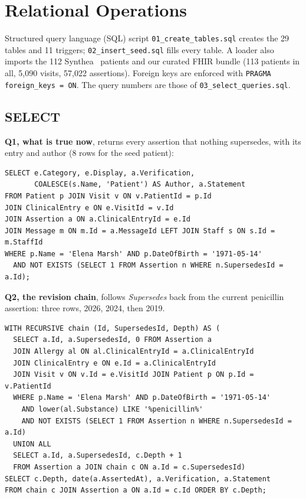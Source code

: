 \documentclass[sigconf]{acmart}
\begin{document}
\section{Relational Operations}\label{sec:operations}
Structured query language (SQL) script \texttt{01\_create\_\allowbreak tables.sql} creates the 29 tables and 11 triggers; \texttt{02\_insert\_seed.sql} fills every table. A loader also imports the 112 Synthea~\cite{synthea} patients and our curated FHIR bundle (113 patients in all, 5,090 visits, 57,022 assertions). Foreign keys are enforced with \texttt{PRAGMA foreign\_keys = ON}. The query numbers are those of \texttt{03\_select\_\allowbreak queries.sql}.

\subsection{SELECT}
\textbf{Q1, what is true now}, returns every assertion that nothing supersedes, with its entry and author (8 rows for the seed patient):
\par\noindent\begin{minipage}{\columnwidth}\begin{lstlisting}
SELECT e.Category, e.Display, a.Verification,
       COALESCE(s.Name, 'Patient') AS Author, a.Statement
FROM Patient p JOIN Visit v ON v.PatientId = p.Id
JOIN ClinicalEntry e ON e.VisitId = v.Id
JOIN Assertion a ON a.ClinicalEntryId = e.Id
JOIN Message m ON m.Id = a.MessageId LEFT JOIN Staff s ON s.Id = m.StaffId
WHERE p.Name = 'Elena Marsh' AND p.DateOfBirth = '1971-05-14'
  AND NOT EXISTS (SELECT 1 FROM Assertion n WHERE n.SupersedesId = a.Id);
\end{lstlisting}\end{minipage}\par
\noindent \textbf{Q2, the revision chain}, follows \emph{Supersedes} back from the current penicillin assertion: three rows, 2026, 2024, then 2019.
\par\noindent\begin{minipage}{\columnwidth}\begin{lstlisting}
WITH RECURSIVE chain (Id, SupersedesId, Depth) AS (
  SELECT a.Id, a.SupersedesId, 0 FROM Assertion a
  JOIN Allergy al ON al.ClinicalEntryId = a.ClinicalEntryId
  JOIN ClinicalEntry e ON e.Id = a.ClinicalEntryId
  JOIN Visit v ON v.Id = e.VisitId JOIN Patient p ON p.Id = v.PatientId
  WHERE p.Name = 'Elena Marsh' AND p.DateOfBirth = '1971-05-14'
    AND lower(al.Substance) LIKE '%penicillin%'
    AND NOT EXISTS (SELECT 1 FROM Assertion n WHERE n.SupersedesId = a.Id)
  UNION ALL
  SELECT a.Id, a.SupersedesId, c.Depth + 1
  FROM Assertion a JOIN chain c ON a.Id = c.SupersedesId)
SELECT c.Depth, date(a.AssertedAt), a.Verification, a.Statement
FROM chain c JOIN Assertion a ON a.Id = c.Id ORDER BY c.Depth;
\end{lstlisting}\end{minipage}\par
\end{document}
